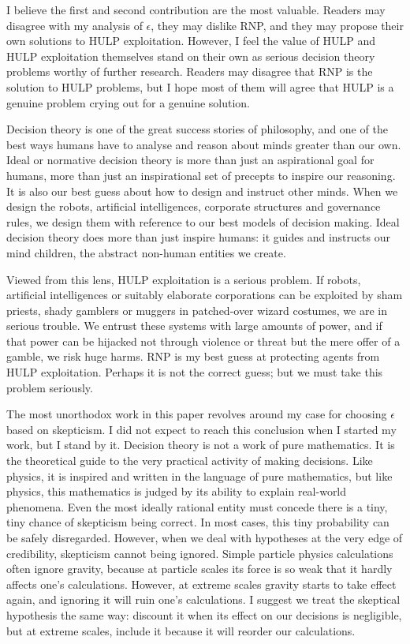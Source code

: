 \documentclass{article}
\begin{document}
I believe the first and second contribution are the most valuable. Readers may disagree with my analysis of \(\epsilon\), they may dislike RNP, and they may propose their own solutions to HULP exploitation. However, I feel the value of HULP and HULP exploitation themselves stand on their own as serious decision theory problems worthy of further research. Readers may disagree that RNP is the solution to HULP problems, but I hope most of them will agree that HULP is a genuine problem crying out for a genuine solution.

Decision theory is one of the great success stories of philosophy, and one of the best ways humans have to analyse and reason about minds greater than our own. Ideal or normative decision theory is more than just an aspirational goal for humans, more than just an inspirational set of precepts to inspire our reasoning. It is also our best guess about how to design and instruct other minds. When we design the robots, artificial intelligences, corporate structures and governance rules, we design them with reference to our best models of decision making. Ideal decision theory does more than just inspire humans: it guides and instructs our mind children, the abstract non-human entities we create. 

Viewed from this lens, HULP exploitation is a serious problem. If robots, artificial intelligences or suitably elaborate corporations can be exploited by sham priests, shady gamblers or muggers in patched-over wizard costumes, we are in serious trouble. We entrust these systems with large amounts of power, and if that power can be hijacked not through violence or threat but the mere offer of a gamble, we risk huge harms. RNP is my best guess at protecting agents from HULP exploitation. Perhaps it is not the correct guess; but we must take this problem seriously.

The most unorthodox work in this paper revolves around my case for choosing \(\epsilon\) based on skepticism. I did not expect to reach this conclusion when I started my work, but I stand by it. Decision theory is not a work of pure mathematics. It is the theoretical guide to the very practical activity of making decisions. Like physics, it is inspired and written in the language of pure mathematics, but like physics, this mathematics is judged by its ability to explain real-world phenomena. Even the most ideally rational entity must concede there is a tiny, tiny chance of skepticism being correct. In most cases, this tiny probability can be safely disregarded. However, when we deal with hypotheses at the very edge of credibility, skepticism cannot being ignored. Simple particle physics calculations often ignore gravity, because at particle scales its force is so weak that it hardly affects one's calculations. However, at extreme scales gravity starts to take effect again, and ignoring it will ruin one's calculations. I suggest we treat the skeptical hypothesis the same way: discount it when its effect on our decisions is negligible, but at extreme scales, include it because it will reorder our calculations.
\end{document}
